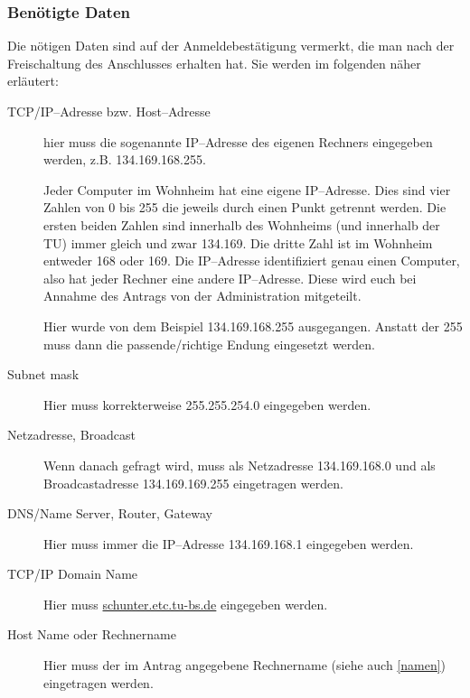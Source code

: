 \subsubsection{Benötigte Daten}
Die nötigen Daten sind auf der Anmeldebestätigung vermerkt, die man
nach der Freischaltung des Anschlusses erhalten hat. Sie werden im
folgenden näher erläutert:
\begin{description}
  \item[TCP/IP--Adresse bzw. Host--Adresse] hier muss die sogenannte IP--Adresse
    des eigenen Rechners eingegeben werden, z.B. 134.169.168.255. 

    Jeder Computer im Wohnheim hat eine eigene IP--Adresse. Dies sind vier
    Zahlen von 0 bis 255 die jeweils durch einen Punkt getrennt werden. Die
    ersten beiden Zahlen sind innerhalb des Wohnheims (und innerhalb der TU)
    immer gleich und zwar 134.169. Die dritte Zahl ist im Wohnheim entweder
    168 oder 169. 
    Die IP--Adresse identifiziert genau einen Computer, also hat jeder Rechner
    eine andere IP--Adresse. Diese wird euch bei Annahme des Antrags von
    der \glossar Administration mitgeteilt.

    Hier wurde von dem Beispiel 134.169.168.255 ausgegangen. Anstatt der 255
    muss dann die passende/richtige Endung eingesetzt werden. 

  \item[Subnet mask] Hier muss korrekterweise 255.255.254.0 eingegeben
    werden.

  \item[Netzadresse, Broadcast] Wenn danach gefragt wird, muss als Netzadresse
    134.169.168.0 und als Broadcastadresse 134.169.169.255 eingetragen werden.

  \item[DNS/Name Server, Router, Gateway] Hier muss immer die
    IP--Adresse 134.169.168.1 eingegeben werden.
 
  \item[TCP/IP Domain Name] Hier muss \url{schunter.etc.tu-bs.de} eingegeben
    werden.

  \item[Host Name oder Rechnername] Hier muss der im Antrag angegebene
    Rechnername (siehe auch \ref{namen}) eingetragen werden.
 
\end{description}

